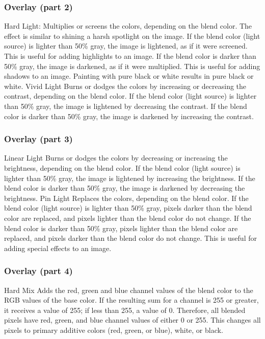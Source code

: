 \documentclass{beamer}
\begin{document}
\begin{frame}
	\frametitle{Overlay (part 2)}
	\begin{outline}
		\1 Hard Light:
		\2 Multiplies or screens the colors, depending on the blend color. The effect is similar to shining a harsh spotlight on the image. If the blend color (light source) is lighter than 50\% gray, the image is lightened, as if it were screened. This is useful for adding highlights to an image. If the blend color is darker than 50\% gray, the image is darkened, as if it were multiplied. This is useful for adding shadows to an image. Painting with pure black or white results in pure black or white.
		\1 Vivid Light
		\2 Burns or dodges the colors by increasing or decreasing the contrast, depending on the blend color. If the blend color (light source) is lighter than 50\% gray, the image is lightened by decreasing the contrast. If the blend color is darker than 50\% gray, the image is darkened by increasing the contrast.
	\end{outline}
\end{frame}

\begin{frame}
	\frametitle{Overlay (part 3)}
	\begin{outline}
		\1 Linear Light
		\2 Burns or dodges the colors by decreasing or increasing the brightness, depending on the blend color. If the blend color (light source) is lighter than 50\% gray, the image is lightened by increasing the brightness. If the blend color is darker than 50\% gray, the image is darkened by decreasing the brightness.
		\1 Pin Light
		\2 Replaces the colors, depending on the blend color. If the blend color (light source) is lighter than 50\% gray, pixels darker than the blend color are replaced, and pixels lighter than the blend color do not change. If the blend color is darker than 50\% gray, pixels lighter than the blend color are replaced, and pixels darker than the blend color do not change. This is useful for adding special effects to an image.
	\end{outline}
\end{frame}

\begin{frame}
	\frametitle{Overlay (part 4)}
	\begin{outline}
		\1 Hard Mix
		\2 Adds the red, green and blue channel values of the blend color to the RGB values of the base color. If the resulting sum for a channel is 255 or greater, it receives a value of 255; if less than 255, a value of 0. Therefore, all blended pixels have red, green, and blue channel values of either 0 or 255. This changes all pixels to primary additive colors (red, green, or blue), white, or black.
	\end{outline}
\end{frame}
\end{document}
